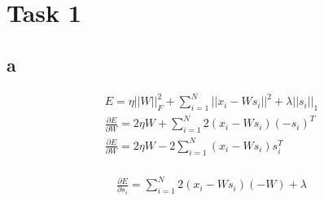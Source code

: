 \section*{Task 1}

\subsection*{a}

\begin{gather*}
E = \eta ||W||^2_F + \sum^N_{i=1} ||x_i - W s_i||^2 + \lambda ||s_i||_1 \\
\frac{\partial E}{\partial W} = 2 \eta W + \sum^N_{i=1} 2(x_i - W s_i) (- s_i)^T \\
\frac{\partial E}{\partial W} = 2 \eta W  -2\sum^N_{i=1} (x_i - W s_i) s_i^T \\
\end{gather*}

\begin{gather*}
\frac{\partial E}{\partial s_i} = \sum^N_{i=1} 2(x_i - W s_i) (-W) + \lambda \\
\end{gather*}

